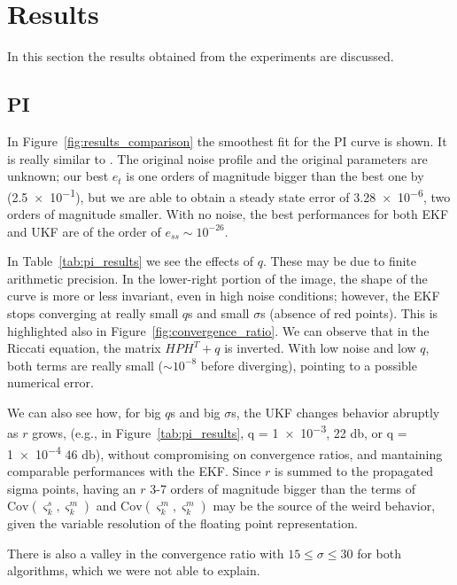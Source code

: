 \documentclass{article}
\begin{document}
\section{Results}




In this section the results obtained from the experiments are discussed.

\subsection{PI}
In Figure~\ref{fig:results_comparison} the smoothest fit for the PI curve is shown. It is really similar to \cite[Figure~3]{UKF}. The original noise profile and the original parameters are unknown; our best $e_t$ is one orders of magnitude bigger than the best one by \citeauthor{UKF} (\num{2.5e-1}), but we are able to obtain a steady state error of \num{3.28e-6}, two orders of magnitude smaller. With no noise, the best performances for both EKF and UKF are of the order of $e_{ss} \sim 10^{-26}$.

In Table~\ref{tab:pi_results} we see the effects of $q$. These may be due to finite arithmetic precision. In the lower-right portion of the image, the shape of the curve is more or less invariant, even in high noise conditions; however, the EKF stops converging at really small $q$s and small $\sigma$s (absence of red points). This is highlighted also in Figure~\ref{fig:convergence_ratio}. We can observe that in the Riccati equation, the matrix $HPH^T +q$ is inverted. With low noise and low $q$, both terms are really small ($\sim10^{-8}$ before diverging), pointing to a possible numerical error.

We can also see how, for big $q$s and big $\sigma$s, the UKF changes behavior abruptly as $r$ grows, (e.g., in Figure~\ref{tab:pi_results}, q = \num{1e-3}, 22 \si{\decibel}, or q = \num{1e-4} 46 \si{\decibel}), without compromising on convergence ratios, and mantaining comparable performances with the EKF. Since $r$ is summed to the propagated sigma points, having an $r$ 3-7 orders of magnitude bigger than the terms of $\mathrm{Cov}(\varsigma^s_k,\varsigma^m_k)$ and $\mathrm{Cov}(\varsigma^m_k,\varsigma^m_k)$ may be the source of the weird behavior, given the variable resolution of the floating point representation.

There is also a valley in the convergence ratio with $15 \leq \sigma \leq 30$ for both algorithms, which we were not able to explain.
\end{document}
